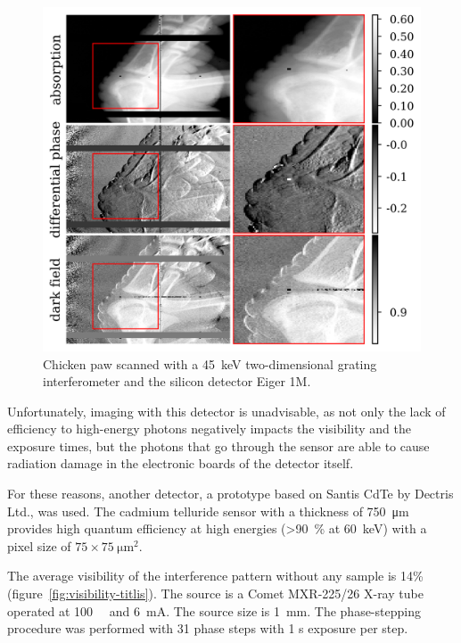\begin{figure}[htb]
    \centering
    \includegraphics[width=\textwidth]{gfx/eiger/series_160729_170729669658_series_160729_171501073073.png}
    \caption[Chicken paw radiography]{Chicken paw scanned with a \SI{45}{\kilo\eV} two-dimensional
grating interferometer and the silicon detector Eiger 1M.}
    \label{fig:eiger-chicken}
\end{figure}

Unfortunately, imaging with this detector is unadvisable, as not only the lack of efficiency to
high-energy photons negatively impacts the visibility and the exposure
times, but the photons that go through the sensor are able to cause
radiation damage in the electronic boards of the detector itself.

For these reasons, another detector, a prototype based on Santis CdTe by
Dectris Ltd., was used. The cadmium
telluride sensor with a thickness of \SI{750}{\micro\meter} provides high
quantum efficiency at high energies (>\SI{90}{\percent} at
\SI{60}{\kilo\eV}) with a pixel size of
$75\times\SI{75}{\micro\meter\squared}$. 

The average visibility of the interference pattern without any
sample is 14\% (figure~\ref{fig:visibility-titlis}). The source is a Comet
MXR-225/26 X-ray tube operated at \SI{100}{\kilo\voltpeak} and
\SI{6}{\milli\ampere}. The source size is \SI{1}{\milli\meter}.
The phase-stepping procedure was performed with 31 phase steps with 1 s
exposure per step.

